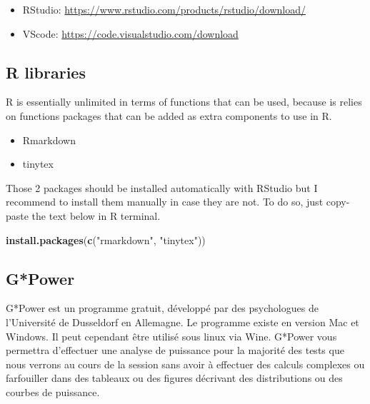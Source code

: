 \documentclass[
  12pt,
]{book}
\newenvironment{Shaded}{\begin{snugshade}}{\end{snugshade}}
\newcommand{\KeywordTok}[1]{\textcolor[rgb]{0.13,0.29,0.53}{\textbf{#1}}}
\newcommand{\NormalTok}[1]{#1}
\newcommand{\StringTok}[1]{\textcolor[rgb]{0.31,0.60,0.02}{#1}}
\providecommand{\tightlist}{%
  \setlength{\itemsep}{0pt}\setlength{\parskip}{0pt}}
\begin{document}
\begin{itemize}
\tightlist
\item
  RStudio: \url{https://www.rstudio.com/products/rstudio/download/}
\item
  VScode: \url{https://code.visualstudio.com/download}
\end{itemize}

\hypertarget{r-libraries}{%
\subsection*{R libraries}\label{r-libraries}}

R is essentially unlimited in terms of functions that can be used, because is relies on functions packages that can be added as extra components to use in R.

\begin{itemize}
\tightlist
\item
  Rmarkdown
\item
  tinytex
\end{itemize}

Those 2 packages should be installed automatically with RStudio but I recommend to install them manually in case they are not. To do so, just copy-paste the text below in R terminal.

\begin{Shaded}
\begin{Highlighting}[]
\KeywordTok{install.packages}\NormalTok{(}\KeywordTok{c}\NormalTok{(}\StringTok{"rmarkdown"}\NormalTok{, }\StringTok{"tinytex"}\NormalTok{))}
\end{Highlighting}
\end{Shaded}

\hypertarget{gpower}{%
\subsection*{G*Power}\label{gpower}}

G*Power est un programme gratuit, développé par des psychologues de l'Université de Dusseldorf en Allemagne.
Le programme existe en version Mac et Windows.
Il peut cependant être utilisé sous linux via Wine.
G*Power vous permettra d'effectuer une analyse de puissance pour la majorité des tests que nous verrons au cours de la session sans avoir à effectuer des calculs complexes ou farfouiller dans des tableaux ou des figures décrivant des distributions ou des courbes de puissance.
\end{document}
